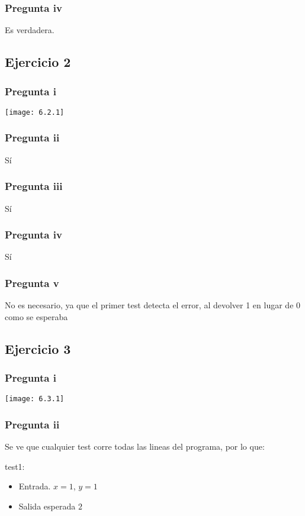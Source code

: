 \subsubsection{Pregunta iv}
Es verdadera.

\subsection{Ejercicio 2}
\subsubsection{Pregunta i}
\texttt{[image: 6.2.1]}

\subsubsection{Pregunta ii}
Sí

\subsubsection{Pregunta iii}
Sí

\subsubsection{Pregunta iv}
Sí

\subsubsection{Pregunta v}
No es necesario, ya que el primer test detecta el error, al devolver 1 en lugar de 0 como se esperaba

\subsection{Ejercicio 3}
\subsubsection{Pregunta i}
\texttt{[image: 6.3.1]}

\subsubsection{Pregunta ii}
Se ve que cualquier test corre todas las lineas del programa, por lo que:

test1:
\begin{itemize}
    \item Entrada. $ x = 1 $, $ y = 1 $
    \item Salida esperada $ 2 $
\end{itemize}

